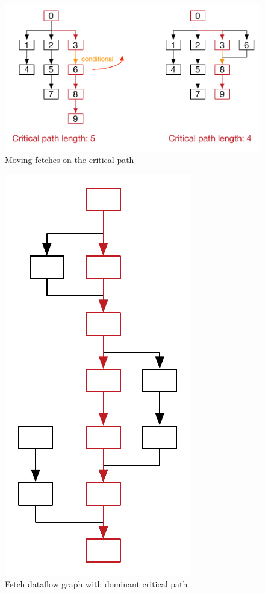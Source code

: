 \begin{figure}
  \includegraphics[width=\textwidth]{../Figures/rewrite-crit-path}
  \caption{Moving fetches on the critical path}
  \label{fig:rewrite-crit-path}
\end{figure}

\begin{figure}
  \includegraphics[width=.5\textwidth]{../Figures/dominant-critical-path}
  \caption{Fetch dataflow graph with dominant critical path}
  \label{fig:dominant-critical-path}
\end{figure}

